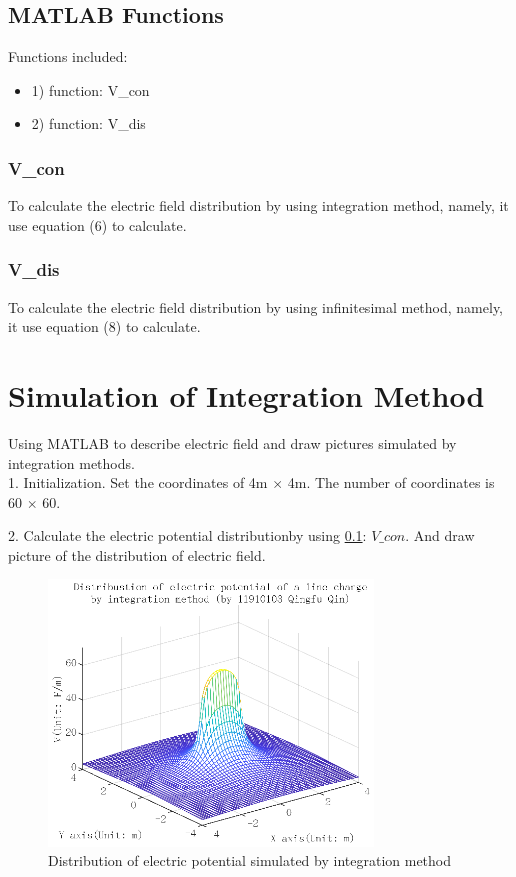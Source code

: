 \documentclass[10pt, journal, final]{IEEEtran}
\begin{document}
\subsection{
    MATLAB Functions
}
\label{func}
Functions included:
\begin{itemize}
    \item 1) function: V\_con
    \item 2) function: V\_dis
\end{itemize}

\subsubsection*{
    V\_con
}
\label{V_con}
To calculate the electric field distribution
by using integration method, namely, it use equation (6) to calculate.


\subsubsection*{
    V\_dis
}
\label{V_dis}
To calculate the electric field distribution
by using infinitesimal method, namely, it use equation (8) to calculate.


\section{
  Simulation of Integration Method
 }
 \label{sec:inte}
Using MATLAB to describe electric field and draw pictures
simulated by integration methods.\\
1. Initialization. Set the coordinates of 4m $\times$ 4m.
The number of coordinates is 60 $\times$ 60.

\label{work1.1}

2. Calculate the electric potential distributionby using \ref{func}: $V\_con$.
And draw picture of the distribution of electric field.

\label{work1.2}

\begin{figure}[htbp]
    \centering
    \includegraphics[width = 3.4in]{figures/fig1.1.eps}
    \caption{Distribution of electric potential simulated by integration method}
    \label{fig:1.1}
\end{figure}
\end{document}
